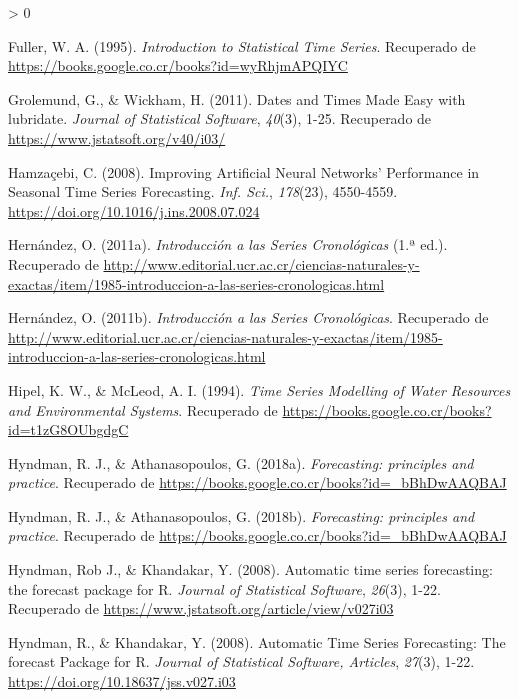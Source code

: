 \documentclass[
]{article}
\newlength{\cslhangindent}
\newenvironment{CSLReferences}[2] %
 {%
  \setlength{\parindent}{0pt}
  \ifodd #1 \everypar{\setlength{\hangindent}{\cslhangindent}}\ignorespaces\fi
  \ifnum #2 > 0
  \setlength{\parskip}{#2\baselineskip}
  \fi
 }%
 {}
\begin{document}
\begin{CSLReferences}{1}{0}
\leavevmode\hypertarget{ref-fuller1995introduction}{}%
Fuller, W. A. (1995). \emph{Introduction to Statistical Time Series}.
Recuperado de \url{https://books.google.co.cr/books?id=wyRhjmAPQIYC}

\leavevmode\hypertarget{ref-lubridate}{}%
Grolemund, G., \& Wickham, H. (2011). Dates and Times Made Easy with
{lubridate}. \emph{Journal of Statistical Software}, \emph{40}(3), 1-25.
Recuperado de \url{https://www.jstatsoft.org/v40/i03/}

\leavevmode\hypertarget{ref-Hamzacebi}{}%
Hamzaçebi, C. (2008). Improving Artificial Neural Networks' Performance
in Seasonal Time Series Forecasting. \emph{Inf. Sci.}, \emph{178}(23),
4550-4559. \url{https://doi.org/10.1016/j.ins.2008.07.024}

\leavevmode\hypertarget{ref-oscarh-1}{}%
Hernández, O. (2011a). \emph{Introducción a las Series Cronológicas}
(1.ª ed.). Recuperado de
\url{http://www.editorial.ucr.ac.cr/ciencias-naturales-y-exactas/item/1985-introduccion-a-las-series-cronologicas.html}

\leavevmode\hypertarget{ref-oscarh-4}{}%
Hernández, O. (2011b). \emph{Introducción a las Series Cronológicas}.
Recuperado de
\url{http://www.editorial.ucr.ac.cr/ciencias-naturales-y-exactas/item/1985-introduccion-a-las-series-cronologicas.html}

\leavevmode\hypertarget{ref-Hipel}{}%
Hipel, K. W., \& McLeod, A. I. (1994). \emph{Time Series Modelling of
Water Resources and Environmental Systems}. Recuperado de
\url{https://books.google.co.cr/books?id=t1zG8OUbgdgC}

\leavevmode\hypertarget{ref-hyndman2018forecasting}{}%
Hyndman, R. J., \& Athanasopoulos, G. (2018a). \emph{Forecasting:
principles and practice}. Recuperado de
\url{https://books.google.co.cr/books?id=_bBhDwAAQBAJ}

\leavevmode\hypertarget{ref-hyndman_box-jenkins}{}%
Hyndman, R. J., \& Athanasopoulos, G. (2018b). \emph{Forecasting:
principles and practice}. Recuperado de
\url{https://books.google.co.cr/books?id=_bBhDwAAQBAJ}

\leavevmode\hypertarget{ref-forecast}{}%
Hyndman, Rob J., \& Khandakar, Y. (2008). Automatic time series
forecasting: the forecast package for {R}. \emph{Journal of Statistical
Software}, \emph{26}(3), 1-22. Recuperado de
\url{https://www.jstatsoft.org/article/view/v027i03}

\leavevmode\hypertarget{ref-auto.arima}{}%
Hyndman, R., \& Khandakar, Y. (2008). Automatic Time Series Forecasting:
The forecast Package for R. \emph{Journal of Statistical Software,
Articles}, \emph{27}(3), 1-22.
\url{https://doi.org/10.18637/jss.v027.i03}


\end{CSLReferences}
\end{document}
